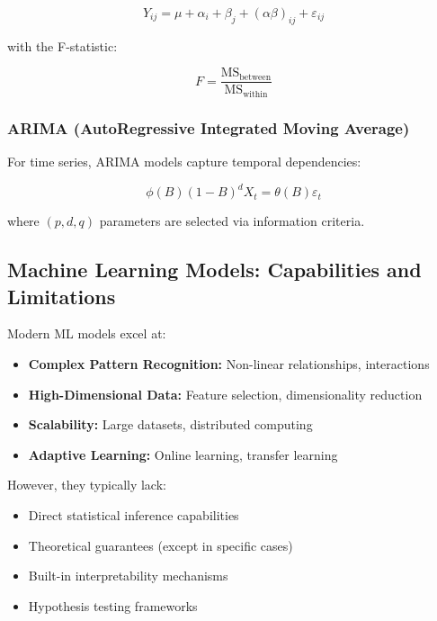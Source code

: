 \documentclass[11pt,a4paper]{article}
\begin{document}
\begin{equation}
Y_{ij} = \mu + \alpha_i + \beta_j + (\alpha\beta)_{ij} + \varepsilon_{ij}
\end{equation}

with the F-statistic:

\begin{equation}
F = \frac{\text{MS}_{\text{between}}}{\text{MS}_{\text{within}}}
\end{equation}

\subsubsection{ARIMA (AutoRegressive Integrated Moving Average)}

For time series, ARIMA models capture temporal dependencies:

\begin{equation}
\phi(B)(1-B)^d X_t = \theta(B)\varepsilon_t
\end{equation}

where $(p,d,q)$ parameters are selected via information criteria.

\subsection{Machine Learning Models: Capabilities and Limitations}

Modern ML models excel at:

\begin{itemize}
    \item \textbf{Complex Pattern Recognition:} Non-linear relationships, interactions
    \item \textbf{High-Dimensional Data:} Feature selection, dimensionality reduction
    \item \textbf{Scalability:} Large datasets, distributed computing
    \item \textbf{Adaptive Learning:} Online learning, transfer learning
\end{itemize}

However, they typically lack:

\begin{itemize}
    \item Direct statistical inference capabilities
    \item Theoretical guarantees (except in specific cases)
    \item Built-in interpretability mechanisms
    \item Hypothesis testing frameworks
\end{itemize}
\end{document}
